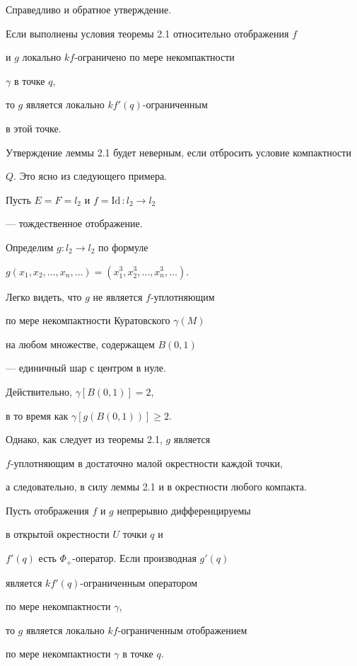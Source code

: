 \begin{notenonum}


Справедливо и обратное утверждение.


Если выполнены условия теоремы 2.1 относительно отображения $f$ 


и $g$ локально $k f$-ограничено по мере некомпактности


$\gamma$ в точке $q$,


то $g$ является локально $k f' (q)$-ограниченным 


в этой точке.


\end{notenonum}





Утверждение леммы 2.1 будет неверным, если отбросить условие компактности


$Q$. Это ясно из следующего примера.





Пусть $E = F = l_2$ и $f =\text{Id}\, : l_2 \to l_2$


--- тождественное отображение.


Определим $g : l_2 \to l_2$ по формуле


$g(x_1, x_2, \dotsc, x_n, \dotsc) = 


(x_1^3, x_2^3, \dotsc, x_n^3, \dotsc)$.


Легко видеть, что $g$ не является $f$-уплотняющим 


по мере некомпактности Куратовского $\gamma (M)$


на любом множестве, содержащем $B(0,1)$


--- единичный шар с центром в нуле.


Действительно, $\gamma [B(0,1)] = 2$,


в то время как $\gamma [g(B(0,1))] \geq 2$.


Однако, как следует из теоремы 2.1, $g$ является 


$f$-уплотняющим в достаточно малой окрестности каждой точки,


а следовательно, в силу леммы 2.1 и в окрестности любого компакта.





\begin{cors}


Пусть отображения $f$ и $g$ непрерывно дифференцируемы 


в открытой окрестности $U$ точки $q$ и


$f' (q)$ есть $\Phi_+$-оператор. Если производная $g' (q)$


является $k f' (q)$-ограниченным оператором 


по мере некомпактности $\gamma$,


то $g$ является локально $k f$-ограниченным отображением


по мере некомпактности $\gamma$ в точке $q$.


\end{cors}





